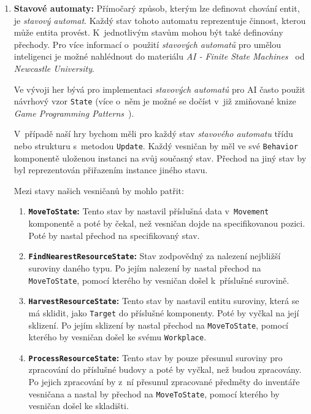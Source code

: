 \begin{enumerate}
    \item \textbf{Stavové automaty:} Přímočarý způsob, kterým lze definovat chování entit, je \textit{stavový automat}. Každý stav tohoto automatu reprezentuje činnost, kterou může entita provést. K~jednotlivým stavům mohou být také definovány přechody. Pro více informací o~použití \textit{stavových automatů} pro umělou inteligenci je možné nahlédnout do materiálu \textit{AI - Finite State Machines}~\cite{AIStateMachines} od \textit{Newcastle University}.

    Ve vývoji her bývá pro implementaci \textit{stavových automatů} pro AI často použit návrhový vzor \texttt{State} (více o~něm je možné se dočíst v~již zmiňované knize \textit{Game Programming Patterns}~\cite{nystrom2014game}).

    V~případě naší hry bychom měli pro každý stav \textit{stavového automatu} třídu nebo strukturu s~metodou \texttt{Update}. Každý vesničan by měl ve své \texttt{Behavior} komponentě uloženou instanci na svůj současný stav. Přechod na jiný stav by byl reprezentován přiřazením instance jiného stavu.

    Mezi stavy našich vesničanů by mohlo patřit:
    \begin{enumerate}
        \item \textbf{\texttt{MoveToState}:} Tento stav by nastavil příslušná data v~\texttt{Movement} komponentě a poté by čekal, než vesničan dojde na specifikovanou pozici. Poté by nastal přechod na specifikovaný stav.

        \item \textbf{\texttt{FindNearestResourceState}:} Stav zodpovědný za nalezení nejbližší suroviny daného typu. Po jejím nalezení by nastal přechod na \texttt{MoveToState}, pomocí kterého by vesničan došel k~příslušné surovině.

        \item \textbf{\texttt{HarvestResourceState}:} Tento stav by nastavil entitu suroviny, která se má sklidit, jako \texttt{Target} do příslušné komponenty. Poté by vyčkal na její sklizení. Po jejím sklizení by nastal přechod na \texttt{MoveToState}, pomocí kterého by vesničan došel ke svému \texttt{Workplace}.

        \item \textbf{\texttt{ProcessResourceState}:} Tento stav by pouze přesunul suroviny pro zpracování do příslušné budovy a poté by vyčkal, než budou zpracovány. Po jejich zpracování by z~ní přesunul zpracované předměty do inventáře vesničana a nastal by přechod na \texttt{MoveToState}, pomocí kterého by vesničan došel ke skladišti.


\end{enumerate}
\end{enumerate}
